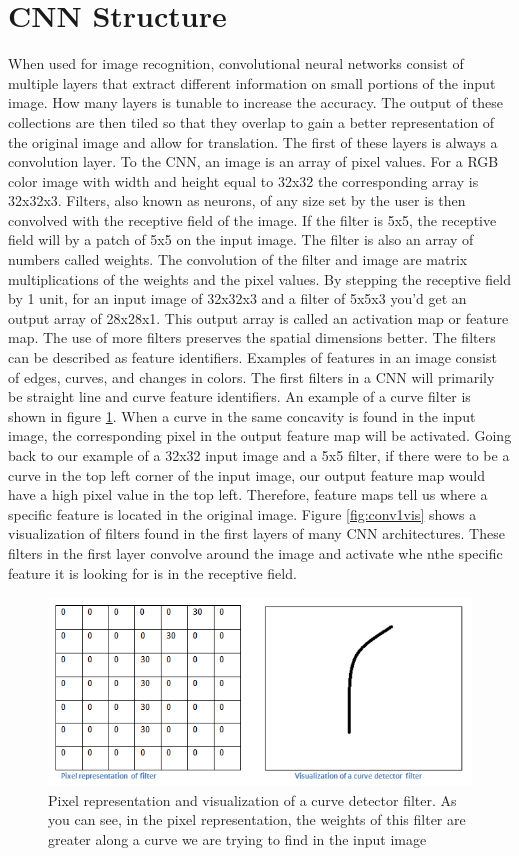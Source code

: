 \section{CNN Structure}
When used for image recognition, convolutional neural networks consist of multiple layers that extract different information on small portions of the input image. How many layers is tunable to increase the accuracy. The output of these collections are then tiled so that they overlap to gain a better representation of the original image and allow for translation. The first of these layers is always a convolution layer. To the CNN, an image is an array of pixel values. For a RGB color image with width and height equal to 32x32 the corresponding array is 32x32x3. Filters, also known as neurons, of any size set by the user is then convolved with the receptive field of the image. If the filter is 5x5, the receptive field will by a patch of 5x5 on the input image. The filter is also an array of numbers called weights. The convolution of the filter and image are matrix multiplications of the weights and the pixel values. By stepping the receptive field by 1 unit, for an input image of 32x32x3 and a filter of 5x5x3 you'd get an output array of 28x28x1. This output array is called an activation map or feature map. The use of more filters preserves the spatial dimensions better. The filters can be described as feature identifiers. Examples of features in an image consist of edges, curves, and changes in colors. The first filters in a CNN will primarily be straight line and curve feature identifiers. An example of a curve filter is shown in figure \ref{fig:curvedetector}. When a curve in the same concavity is found in the input image, the corresponding pixel in the output feature map will be activated. Going back to our example of a 32x32 input image and a 5x5 filter, if there were to be a curve in the top left corner of the input image, our output feature map would have a high pixel value in the top left. Therefore, feature maps tell us where a specific feature is located in the original image. Figure \ref{fig:conv1vis} shows a visualization of filters found in the first layers of many CNN architectures. These filters in the first layer convolve around the image and activate whe nthe specific feature it is looking for is in the receptive field. 
\begin{figure}[htp!]
\centering
\includegraphics[width=.6\textwidth]{figs/curvedetector.png}
\caption{Pixel representation and visualization of a curve detector filter. As you can see, in the pixel representation, the weights of this filter are greater along a curve we are trying to find in the input image}
\label{fig:curvedetector}
\end{figure} 

